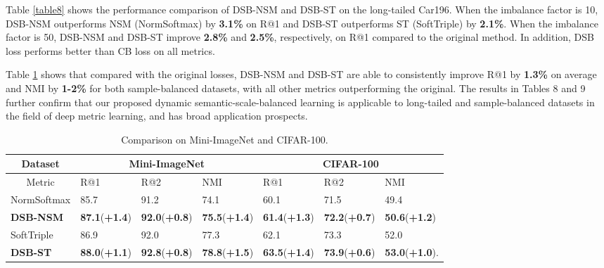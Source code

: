\documentclass[10pt]{article} %
\begin{document}
Table \ref{table8} shows the performance comparison of DSB-NSM and DSB-ST on the long-tailed Car196. When the imbalance factor is 10, DSB-NSM outperforms NSM (NormSoftmax) by \textbf{3.1\%} on R@1 and DSB-ST outperforms ST (SoftTriple) by \textbf{2.1\%}. When the imbalance factor is 50, DSB-NSM and DSB-ST improve \textbf{2.8\%} and \textbf{2.5\%}, respectively, on R@1 compared to the original method. In addition, DSB loss performs better than CB loss on all metrics.

Table \ref{table9} shows that compared with the original losses, DSB-NSM and DSB-ST are able to consistently improve R@1 by \textbf{1.3\%} on average and NMI by \textbf{1-2\%} for both sample-balanced datasets, with all other metrics outperforming the original. The results in Tables 8 and 9 further confirm that our proposed dynamic semantic-scale-balanced learning is applicable to long-tailed and sample-balanced datasets in the field of deep metric learning, and has broad application prospects.


\begin{table}[H]
\vskip -0.05in
\renewcommand\arraystretch{1.2}
\setlength{\tabcolsep}{6.3pt} %
\caption{Comparison on Mini-ImageNet and CIFAR-100.}
\vskip 0.05in
\label{table9}
\centering  
\begin{tabular}{l|lll| lll}
\hline \toprule 
\multicolumn{1}{c|}{Dataset}    & \multicolumn{3}{c}{Mini-ImageNet}  & \multicolumn{3}{|c}{CIFAR-100}  \\ \midrule
\multicolumn{1}{c|}{Metric}    & R@1   & R@2   & NMI  & R@1   & R@2   & NMI  \\  \toprule
NormSoftmax &85.7 & 91.2  & 74.1  & 60.1 & 71.5 & 49.4\\
\textbf{DSB-NSM}  & \textbf{87.1}(\textcolor[RGB]{0,201,87}{\textbf{+1.4}}) & \textbf{92.0}(\textcolor[RGB]{0,201,87}{\textbf{+0.8}})  & \textbf{75.5}(\textcolor[RGB]{0,201,87}{\textbf{+1.4}}) & \textbf{61.4}(\textcolor[RGB]{0,201,87}{\textbf{+1.3}}) & \textbf{72.2}(\textcolor[RGB]{0,201,87}{\textbf{+0.7}})  & \textbf{50.6}(\textcolor[RGB]{0,201,87}{\textbf{+1.2}}) \\  \midrule 
SoftTriple & 86.9 & 92.0  & 77.3 &62.1 & 73.3 & 52.0  \\ 
\textbf{DSB-ST}  & \textbf{88.0}(\textcolor[RGB]{0,201,87}{\textbf{+1.1}}) & \textbf{92.8}(\textcolor[RGB]{0,201,87}{\textbf{+0.8}})  & \textbf{78.8}(\textcolor[RGB]{0,201,87}{\textbf{+1.5}}) & \textbf{63.5}(\textcolor[RGB]{0,201,87}{\textbf{+1.4}}) & \textbf{73.9}(\textcolor[RGB]{0,201,87}{\textbf{+0.6}})  & \textbf{53.0}(\textcolor[RGB]{0,201,87}{\textbf{+1.0}}).  \\ \bottomrule \hline
 \end{tabular}
\vskip -0.1in
\end{table}
\end{document}
